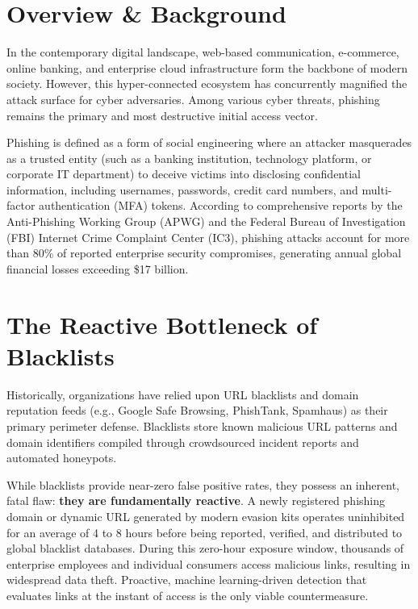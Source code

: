 \documentclass[12pt,a4paper,oneside]{report}
\begin{document}
\section{Overview \& Background}
In the contemporary digital landscape, web-based communication, e-commerce, online banking, and enterprise cloud infrastructure form the backbone of modern society. However, this hyper-connected ecosystem has concurrently magnified the attack surface for cyber adversaries. Among various cyber threats, phishing remains the primary and most destructive initial access vector. 

Phishing is defined as a form of social engineering where an attacker masquerades as a trusted entity (such as a banking institution, technology platform, or corporate IT department) to deceive victims into disclosing confidential information, including usernames, passwords, credit card numbers, and multi-factor authentication (MFA) tokens. According to comprehensive reports by the Anti-Phishing Working Group (APWG) and the Federal Bureau of Investigation (FBI) Internet Crime Complaint Center (IC3), phishing attacks account for more than 80\% of reported enterprise security compromises, generating annual global financial losses exceeding \$17 billion.

\section{The Reactive Bottleneck of Blacklists}
Historically, organizations have relied upon URL blacklists and domain reputation feeds (e.g., Google Safe Browsing, PhishTank, Spamhaus) as their primary perimeter defense. Blacklists store known malicious URL patterns and domain identifiers compiled through crowdsourced incident reports and automated honeypots. 

While blacklists provide near-zero false positive rates, they possess an inherent, fatal flaw: \textbf{they are fundamentally reactive}. A newly registered phishing domain or dynamic URL generated by modern evasion kits operates uninhibited for an average of 4 to 8 hours before being reported, verified, and distributed to global blacklist databases. During this zero-hour exposure window, thousands of enterprise employees and individual consumers access malicious links, resulting in widespread data theft. Proactive, machine learning-driven detection that evaluates links at the instant of access is the only viable countermeasure.
\end{document}
